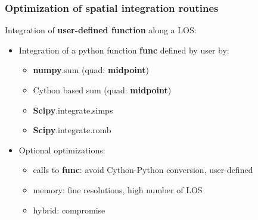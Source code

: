 \documentclass[10pt]{beamer}
\begin{document}
\begin{frame}
\frametitle{Optimization of spatial integration routines}

Integration of \textbf{user-defined function} along a LOS:
	\begin{itemize}
	\item Integration of a python function \textbf{func} defined by user by:
		\begin{itemize}
		\item \textbf{numpy}.sum (quad: \textbf{midpoint})
		\item Cython based sum (quad: \textbf{midpoint})
		\item \textbf{Scipy}.integrate.simps
		\item \textbf{Scipy}.integrate.romb
		\end{itemize}
	\item Optional optimizations:
		\begin{itemize}
		\item calls to \textbf{func}: avoid Cython-Python conversion, user-defined
		\item memory: fine resolutions, high number of LOS
		\item hybrid: compromise
		\end{itemize}
	\end{itemize}
	
\end{frame}


%
%
%
%  
%
\end{document}
